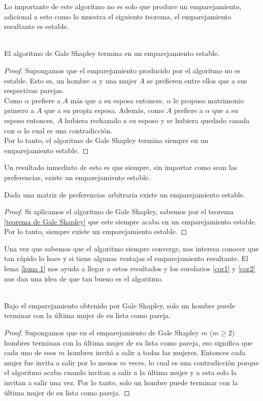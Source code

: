 Lo importante de este algoritmo no es solo que produce un emparejamiento, adicional a esto como lo muestra el siguiente teorema, el emparejamiento resultante es estable. 
\begin{teo} \cite{GaleShapley} \\
\label{teorema de Gale Shapley}
El algoritmo de Gale Shapley termina en un emparejamiento estable.
\end{teo}
\begin{proof}
Supongamos que el emparejamiento producido por el algoritmo no es estable. Esto es, un hombre $\alpha$ y una mujer $A$ se prefieren entre ellos que a sus respectivas parejas. \\
Como $\alpha$ prefiere a $A$ más que a su esposa entonces, $\alpha$ le propuso matrimonio primero a $A$ que a su propia esposa. 
Además, como $A$ prefiere a $\alpha$ que a su esposo entonces, $A$ hubiera rechazado a su esposo y se hubiera quedado casada con $\alpha$ lo cual es una contradicción. \\
Por lo tanto, el algoritmo de Gale Shapley termina siempre en un emparejamiento estable. 
\end{proof}
Un resultado inmediato de esto es que siempre, sin importar como sean las preferencias, existe un emparejamiento estable. 
\begin{cor}
\label{corexiste}
Dada una matriz de preferencias arbitraria existe un emparejamiento estable. 
\end{cor}
\begin{proof}
Si aplicamos el algoritmo de Gale Shapley, sabemos por el teorema \ref{teorema de Gale Shapley} que este siempre acaba en un emparejamiento estable. Por lo tanto, siempre existe un emparejamiento estable.
\end{proof}

Una vez que sabemos que el algoritmo siempre converge, nos interesa conocer que tan rápido lo hace y si tiene algunas ventajas el emparejamiento resultante. El lema \ref{lema 1} nos ayuda a llegar a estos resultados y los corolarios \ref{cor1} y \ref{cor2} nos dan una idea de que tan bueno es el algoritmo. 
\begin{lem} 
\label{lema 1} \cite{Knuth} \\
Bajo el emparejamiento obtenido por Gale Shapley, solo un hombre puede terminar con la última mujer de su lista como pareja. 
\end{lem}

\begin{proof}

Supongamos que en el emparejamiento de Gale Shapley $m$ ($m\geq2$) hombres terminan con la última mujer de su lista como pareja, eso significa que cada uno de esos $m$ hombres invitó a salir a todas las mujeres. Entonces cada mujer fue invita a salir por lo menos $m$ veces, lo cual es una contradicción porque el algoritmo acaba cuando invitan a salir a la última mujer y a esta solo la invitan a salir una vez. Por lo tanto, solo un hombre puede terminar con la última mujer de su lista como pareja. 
\end{proof}

